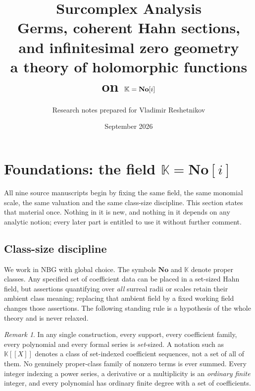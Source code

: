 \documentclass[11pt,a4paper]{article}
\title{\textbf{Surcomplex Analysis}\\[4pt]
\large Germs, coherent Hahn sections, and infinitesimal zero geometry\\[2pt]
\normalsize a theory of holomorphic functions on $\K=\No[i]$}
\author{Research notes prepared for Vladimir Reshetnikov}
\date{September 2026}
\numberwithin{equation}{section}
\theoremstyle{definition}
\theoremstyle{remark}
\newtheorem{remark}[theorem]{Remark}
\theoremstyle{plain}
\newcommand{\K}{\mathbb K}
\newcommand{\No}{\mathbf{No}}
\begin{document}
\maketitle
\setcounter{tocdepth}{2}
\tableofcontents
\clearpage



\section{Foundations: the field \texorpdfstring{$\K=\No[i]$}{K = No[i]}}\label{a:sec:field}

All nine source manuscripts begin by fixing the same field, the same
monomial scale, the same valuation and the same class-size discipline.
This section states that material once.  Nothing in it is new, and
nothing in it depends on any analytic notion; every later part is
entitled to use it without further comment.

\subsection{Class-size discipline}\label{a:sec:size}

We work in \textsf{NBG} with global choice. The symbols $\No$ and
$\K$ denote proper classes. Any specified set of coefficient data can
be placed in a set-sized Hahn field, but assertions quantifying over
\emph{all} surreal radii or scales retain their ambient class meaning;
replacing that ambient field by a fixed working field changes those
assertions.  The following standing rule is a hypothesis of the whole
theory and is never relaxed.

\begin{remark}\label{a:rule:size}
In any single construction, every support, every coefficient family,
every polynomial and every formal series is \emph{set}-sized.  A
notation such as $\K[[X]]$ denotes a class of set-indexed coefficient
sequences, not a set of all of them.  No genuinely proper-class family
of nonzero terms is ever summed.  Every integer indexing a power series,
a derivative or a multiplicity is an \emph{ordinary finite} integer, and
every polynomial has ordinary finite degree with a set of coefficients.
\end{remark}
\end{document}
